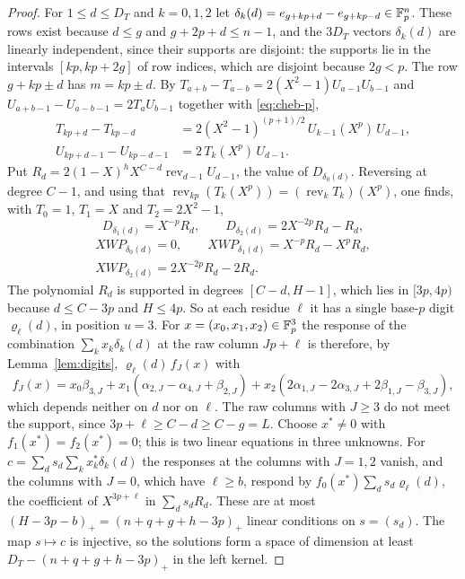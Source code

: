 \begin{proof}
For $1\le d\le D_T$ and $k=0,1,2$ let $\delta_k(d)=e_{g+kp+d}-e_{g+kp-d}\in\mathbb F_p^n$. These rows exist because
$d\le g$ and $g+2p+d\le n-1$, and the $3D_T$ vectors $\delta_k(d)$ are linearly independent, since their supports
are disjoint: the supports lie in the intervals $[kp,kp+2g]$ of row indices, which are disjoint because
$2g<p$. The row $g+kp\pm d$ has $m=kp\pm d$. By $T_{a+b}-T_{a-b}=2(X^2-1)U_{a-1}U_{b-1}$ and
$U_{a+b-1}-U_{a-b-1}=2T_aU_{b-1}$ together with \eqref{eq:cheb-p},
\begin{align*}
 T_{kp+d}-T_{kp-d}&=2(X^2-1)^{(p+1)/2}\,U_{k-1}(X^p)\,U_{d-1},\\
 U_{kp+d-1}-U_{kp-d-1}&=2\,T_k(X^p)\,U_{d-1}.
\end{align*}
Put $R_d=2(1-X)^hX^{C-d}\operatorname{rev}_{d-1}U_{d-1}$, the value of $D_{\delta_0(d)}$. Reversing at degree $C-1$,
and using that $\operatorname{rev}_{kp}(T_k(X^p))=(\operatorname{rev}_kT_k)(X^p)$, one finds, with $T_0=1$, $T_1=X$ and
$T_2=2X^2-1$,
\[
 D_{\delta_1(d)}=X^{-p}R_d,\qquad D_{\delta_2(d)}=2X^{-2p}R_d-R_d,
\]
\begin{gather*}
 XWP_{\delta_0(d)}=0,\qquad XWP_{\delta_1(d)}=X^{-p}R_d-X^pR_d,\\
 XWP_{\delta_2(d)}=2X^{-2p}R_d-2R_d .
\end{gather*}
The polynomial $R_d$ is supported in degrees $[C-d,H-1]$, which lies in $[3p,4p)$ because $d\le C-3p$ and
$H\le4p$. So at each residue $\ell$ it has a single base-$p$ digit $\varrho_\ell(d)$, in position $u=3$.
For $x=(x_0,x_1,x_2)\in\mathbb F_p^3$ the response of the combination $\sum_kx_k\delta_k(d)$ at the raw column
$Jp+\ell$ is therefore, by Lemma~\ref{lem:digits}, $\varrho_\ell(d)\,f_J(x)$ with
\[
 f_J(x)=x_0\beta_{3,J}+x_1(\alpha_{2,J}-\alpha_{4,J}+\beta_{2,J})+x_2(2\alpha_{1,J}-2\alpha_{3,J}+2\beta_{1,J}-\beta_{3,J}),
\]
which depends neither on $d$ nor on $\ell$. The raw columns with $J\ge3$ do not meet the support, since
$3p+\ell\ge C-d\ge C-g=L$. Choose $x^*\ne0$ with $f_1(x^*)=f_2(x^*)=0$; this is two linear equations in three
unknowns. For $c=\sum_ds_d\sum_kx^*_k\delta_k(d)$ the responses at the columns with $J=1,2$ vanish, and the
columns with $J=0$, which have $\ell\ge b$, respond by $f_0(x^*)\sum_ds_d\varrho_\ell(d)$, the coefficient
of $X^{3p+\ell}$ in $\sum_ds_dR_d$. These are at most $(H-3p-b)_+=(n+q+g+h-3p)_+$ linear conditions on
$s=(s_d)$. The map $s\mapsto c$ is injective, so the solutions form a space of dimension at least
$D_T-(n+q+g+h-3p)_+$ in the left kernel.
\end{proof}

